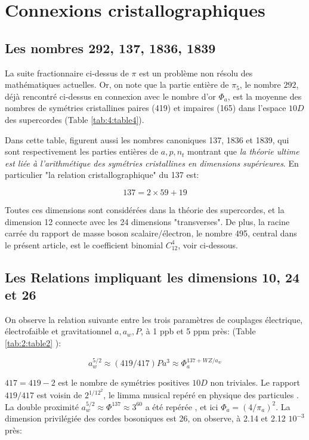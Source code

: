 \documentclass[a4paper,9pt]{article}
\begin{document}
\section{Connexions cristallographiques}

\subsection{Les nombres 292, 137, 1836, 1839}
La suite fractionnaire ci-dessus de $\pi$ est un problème non résolu des mathématiques actuelles. Or, on note que la partie entière de $\pi_5$, le nombre $292$, déjà rencontré ci-dessus en connexion avec le nombre d'or $\Phi_a$, est la moyenne des nombres de symétries cristallines paires (419) et impaires (165) dans l'espace $10D$ des supercordes \cite{Weigel} \cite{Veysseyre} (Table \ref{tab:4:table4}).

Dans cette table, figurent aussi les nombres canoniques 137, 1836 et 1839, qui sont respectivement les parties entières de $a, p, n_t$  montrant que \textit{la théorie ultime est liée à l'arithmétique des symétries cristallines en dimensions supérieures}. En particulier "la relation cristallographique" du 137 est:

\begin{equation}
  137 = 2 \times 59 + 19 
\end{equation}

Toutes ces dimensions sont considérées dans la théorie des supercordes, et la dimension 12 connecte avec les 24 dimensions "transverses". De plus, la racine carrée du rapport de masse boson scalaire/électron, le nombre 495, central dans le présent article, est le coefficient binomial $C_{12}^4$, voir ci-dessous.

\subsection{Les Relations impliquant les dimensions 10, 24 et 26}
On observe la relation suivante entre les trois paramètres de couplages électrique, électrofaible et gravitationnel $a, a_w, P$, à 1 ppb et 5 ppm près: (Table \ref{tab:2:table2} ):

\begin{equation}
a_w^{5/2} \approx (419/417) P a^3 \approx \Phi_a^{137 + WZ/a_w}
 \end{equation}

$417 = 419 - 2$ est le nombre de symétries positives $10D$ non triviales. Le rapport $419/417$ est voisin de $2^{1/12^2}$, le limma musical repéré en physique des particules \cite{Sternheimer}. La double proximité $a_w^{5/2} \approx \Phi^{137} \approx 3^{60}$ a été repérée \cite{Sanchez1}, et ici $ \Phi_a = (4/\pi_a)^2$.
La dimension privilégiée des cordes bosoniques est 26, on observe, à 2.14 et 2.12 $10^{-3}$ près:
\end{document}
